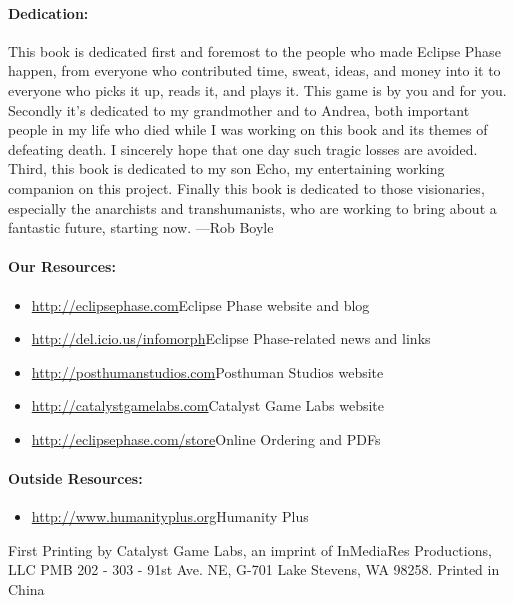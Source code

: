 \paragraph{Dedication:}
\label{sec:dedication}
This book is dedicated first and foremost to the people who made
Eclipse Phase happen, from everyone who contributed time, sweat,
ideas, and money into it to everyone who picks it up, reads it, and
plays it. This game is by you and for you.  Secondly it's dedicated to
my grandmother and to Andrea, both important people in my life who
died while I was working on this book and its themes of defeating
death. I sincerely hope that one day such tragic losses are
avoided. Third, this book is dedicated to my son Echo, my entertaining
working companion on this project. Finally this book is dedicated to
those visionaries, especially the anarchists and transhumanists, who
are working to bring about a fantastic future, starting now. —Rob
Boyle

\paragraph{Our Resources:}
\label{sec:our-resources}

\begin{itemize}
\item \url{http://eclipsephase.com}{Eclipse Phase website and blog}
\item \url{http://del.icio.us/infomorph}{Eclipse Phase-related news and links}
\item \url{http://posthumanstudios.com}{Posthuman Studios website}
\item \url{http://catalystgamelabs.com}{Catalyst Game Labs website}
\item \url{http://eclipsephase.com/store}{Online Ordering and PDFs}
\end{itemize}

\paragraph{Outside Resources:}
\label{sec:outside-resources}

\begin{itemize}
\item \url{http://www.humanityplus.org}{Humanity Plus}
\end{itemize}

First Printing by Catalyst Game Labs, an imprint of InMediaRes
Productions, LLC PMB 202 - 303 - 91st Ave. NE, G-701 Lake Stevens, WA
98258.  Printed in China

